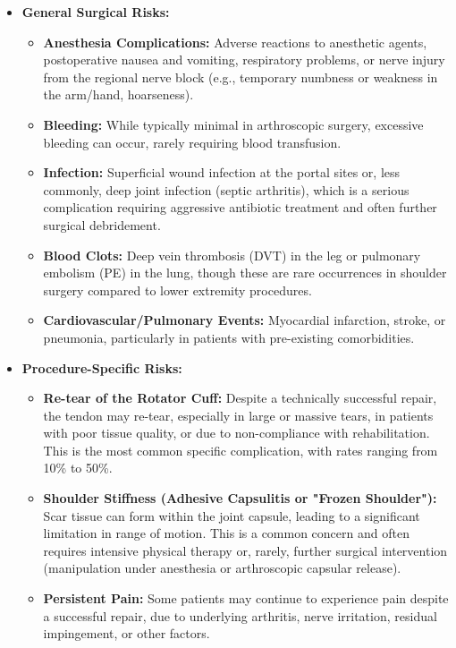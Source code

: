 \begin{itemize}
  \item \textbf{General Surgical Risks:}
    \begin{itemize}
      \item \textbf{Anesthesia Complications:} Adverse reactions to anesthetic agents, postoperative nausea and vomiting, respiratory problems, or nerve injury from the regional nerve block (e.g., temporary numbness or weakness in the arm/hand, hoarseness).
      \item \textbf{Bleeding:} While typically minimal in arthroscopic surgery, excessive bleeding can occur, rarely requiring blood transfusion.
      \item \textbf{Infection:} Superficial wound infection at the portal sites or, less commonly, deep joint infection (septic arthritis), which is a serious complication requiring aggressive antibiotic treatment and often further surgical debridement.
      \item \textbf{Blood Clots:} Deep vein thrombosis (DVT) in the leg or pulmonary embolism (PE) in the lung, though these are rare occurrences in shoulder surgery compared to lower extremity procedures.
      \item \textbf{Cardiovascular/Pulmonary Events:} Myocardial infarction, stroke, or pneumonia, particularly in patients with pre-existing comorbidities.
    \end{itemize}
  \item \textbf{Procedure-Specific Risks:}
    \begin{itemize}
      \item \textbf{Re-tear of the Rotator Cuff:} Despite a technically successful repair, the tendon may re-tear, especially in large or massive tears, in patients with poor tissue quality, or due to non-compliance with rehabilitation. This is the most common specific complication, with rates ranging from 10\% to 50\%.
      \item \textbf{Shoulder Stiffness (Adhesive Capsulitis or "Frozen Shoulder"):} Scar tissue can form within the joint capsule, leading to a significant limitation in range of motion. This is a common concern and often requires intensive physical therapy or, rarely, further surgical intervention (manipulation under anesthesia or arthroscopic capsular release).
      \item \textbf{Persistent Pain:} Some patients may continue to experience pain despite a successful repair, due to underlying arthritis, nerve irritation, residual impingement, or other factors.

\end{itemize}
\end{itemize}
